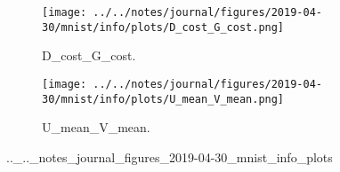 \begin{figure}[!htbp]
   \centering
\begin{subfigure}[t]{0.48\textwidth}
   \texttt{[image: ../../notes/journal/figures/2019-04-30/mnist/info/plots/D\_cost\_G\_cost.png]}
   \caption{D_cost_G_cost.}
   \label{fig:.._.._notes_journal_figures_2019-04-30_mnist_info_plots-a}
\end{subfigure}
\begin{subfigure}[t]{0.48\textwidth}
   \texttt{[image: ../../notes/journal/figures/2019-04-30/mnist/info/plots/U\_mean\_V\_mean.png]}
   \caption{U_mean_V_mean.}
   \label{fig:.._.._notes_journal_figures_2019-04-30_mnist_info_plots-b}
\end{subfigure}
   \caption{.._.._notes_journal_figures_2019-04-30_mnist_info_plots}
   \label{fig:.._.._notes_journal_figures_2019-04-30_mnist_info_plots}
\end{figure}
